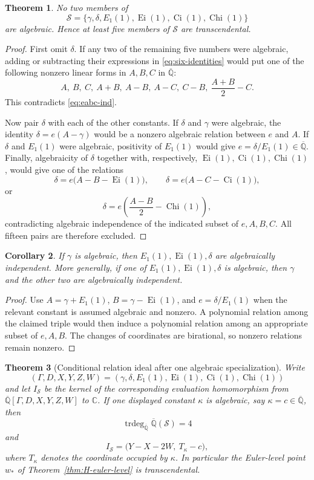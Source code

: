 \documentclass[11pt]{article}
\newtheorem{theorem}{Theorem}[section]
\newtheorem{corollary}[theorem]{Corollary}
\theoremstyle{definition}
\theoremstyle{remark}
\newcommand{\Qb}{\overline{\mathbb Q}}
\newcommand{\Qbar}{\overline{\mathbb Q}}
\newcommand{\C}{\mathbb C}
\newcommand{\trdeg}{\operatorname{trdeg}}
\newcommand{\Ei}{\operatorname{Ei}}
\newcommand{\Ci}{\operatorname{Ci}}
\newcommand{\Chi}{\operatorname{Chi}}
\begin{document}
\begin{theorem}\label{thm:six}
No two members of
\[
 \mathcal S=\{\gamma,\delta,E_1(1),\Ei(1),\Ci(1),\Chi(1)\}
\]
are algebraic.  Hence at least five members of \(\mathcal S\) are
transcendental.
\end{theorem}

\begin{proof}
First omit \(\delta\).  If any two of the remaining five numbers were
algebraic, adding or subtracting their expressions in
\eqref{eq:six-identities} would put one of the following nonzero linear forms
in \(A,B,C\) in \(\Qb\):
\[
 A,\ B,\ C,\ A+B,\ A-B,\ A-C,\ C-B,\ \frac{A+B}{2}-C.
\]
This contradicts \eqref{eq:eabc-ind}.

Now pair \(\delta\) with each of the other constants.  If \(\delta\) and
\(\gamma\) were algebraic, the identity
\(\delta=e(A-\gamma)\) would be a nonzero algebraic relation between \(e\)
and \(A\).  If \(\delta\) and \(E_1(1)\) were algebraic, positivity of
\(E_1(1)\) would give \(e=\delta/E_1(1)\in\Qb\).  Finally, algebraicity of
\(\delta\) together with, respectively, \(\Ei(1),\Ci(1),\Chi(1)\), would give
one of the relations
\[
 \delta=e\bigl(A-B-\Ei(1)\bigr),\qquad
 \delta=e\bigl(A-C-\Ci(1)\bigr),
\]
or
\[
 \delta=e\left(\frac{A-B}{2}-\Chi(1)\right),
\]
contradicting algebraic independence of the indicated subset of
\(e,A,B,C\).  All fifteen pairs are therefore excluded.
\end{proof}

\begin{corollary}\label{cor:conditional-triples}
If \(\gamma\) is algebraic, then \(E_1(1),\Ei(1),\delta\) are algebraically
independent.  More generally, if one of \(E_1(1),\Ei(1),\delta\) is algebraic,
then \(\gamma\) and the other two are algebraically independent.
\end{corollary}

\begin{proof}
Use \(A=\gamma+E_1(1)\), \(B=\gamma-\Ei(1)\), and
\(e=\delta/E_1(1)\) when the relevant constant is assumed algebraic and
nonzero.  A polynomial relation among the claimed triple would then induce a
polynomial relation among an appropriate subset of \(e,A,B\).  The changes of
coordinates are birational, so nonzero relations remain nonzero.
\end{proof}

\begin{theorem}[Conditional relation ideal after one algebraic specialization]
\label{thm:six-one-algebraic}
Write
\[
 (\Gamma,D,X,Y,Z,W)
 =
 (\gamma,\delta,E_1(1),\Ei(1),\Ci(1),\Chi(1))
\]
and let \(I_{\mathcal S}\) be the kernel of the corresponding evaluation
homomorphism from \(\Qbar[\Gamma,D,X,Y,Z,W]\) to \(\C\).  If one displayed
constant \(\kappa\) is algebraic, say \(\kappa=c\in\Qbar\), then
\[
 \trdeg_{\Qbar}\Qbar(\mathcal S)=4
\]
and
\begin{equation}\label{eq:six-one-algebraic-ideal}
 \boxed{
 I_{\mathcal S}
 =\bigl(Y-X-2W,\ T_\kappa-c\bigr),}
\end{equation}
where \(T_\kappa\) denotes the coordinate occupied by \(\kappa\).  In
particular the Euler-level point \(w_*\) of
Theorem~\ref{thm:H-euler-level} is transcendental.
\end{theorem}
\end{document}
